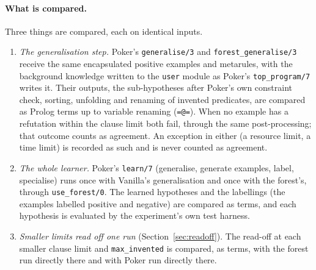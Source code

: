\documentclass[11pt]{article}
\begin{document}
\paragraph{What is compared.} Three things are compared, each on identical inputs.
\begin{enumerate}
\item \emph{The generalisation step.} Poker's \nolinkurl{generalise/3} and
  \nolinkurl{forest_generalise/3} receive the same encapsulated positive examples and
  metarules, with the background knowledge written to the \texttt{user} module as
  Poker's \nolinkurl{top_program/7} writes it. Their outputs, the sub-hypotheses after
  Poker's own constraint check, sorting, unfolding and renaming of invented
  predicates, are compared as Prolog terms up to variable renaming
  (\texttt{=@=}). When no example has a refutation within the clause limit both
  fail, through the same post-processing; that outcome counts as agreement. An
  exception in either (a resource limit, a time limit) is recorded as such and is
  never counted as agreement.
\item \emph{The whole learner.} Poker's \nolinkurl{learn/7} (generalise, generate
  examples, label, specialise) runs once with Vanilla's generalisation and once
  with the forest's, through \nolinkurl{use_forest/0}. The learned hypotheses and the
  labellings (the examples labelled positive and negative) are compared as terms,
  and each hypothesis is evaluated by the experiment's own test harness.
\item \emph{Smaller limits read off one run} (Section~\ref{sec:readoff}). The
  read-off at each smaller clause limit and \texttt{max\_invented} is compared, as
  terms, with the forest run directly there and with Poker run directly there.
\end{enumerate}
\end{document}
